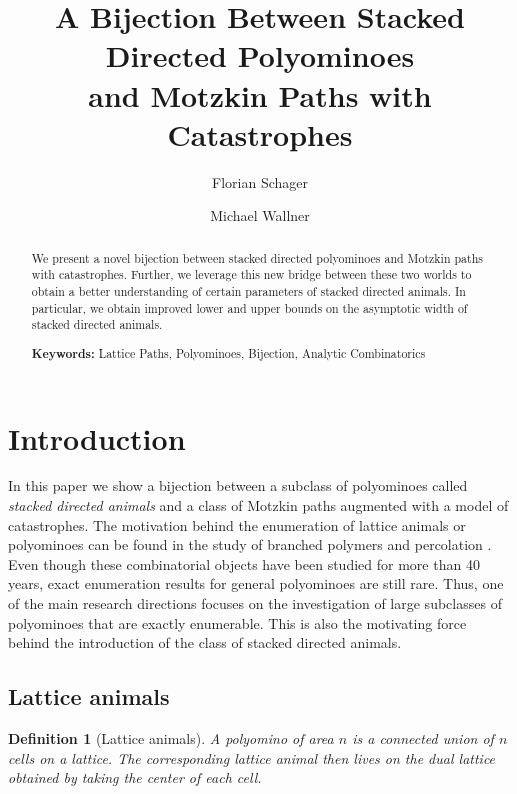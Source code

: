 \documentclass{article}
\title{A Bijection Between Stacked Directed Polyominoes \\ and Motzkin Paths with Catastrophes}
\author{
Florian Schager\addorcid{0009-0009-3923-051X}
\and 
Michael Wallner\addorcid{0000-0001-8581-449X} }
\newtheorem{definition}[theorem]{Definition}
\theoremstyle{definition}
\begin{document}
\maketitle

\begin{abstract}
We present a novel bijection between stacked directed polyominoes and Motzkin paths with catastrophes. Further, we leverage this new bridge between these two worlds to obtain a better understanding of certain parameters of stacked directed animals. In particular, we obtain improved lower and upper bounds on the asymptotic width of stacked directed animals.

\medskip

\noindent\textbf{Keywords: } Lattice Paths, Polyominoes, Bijection, Analytic Combinatorics
\end{abstract}

\tableofcontents

\pagebreak

\section{Introduction}

In this paper we show a bijection between a subclass of polyominoes called \textit{stacked directed animals} and a class of Motzkin paths augmented with a model of catastrophes. The motivation behind the enumeration of lattice animals or polyominoes can be found in the study of branched polymers \cite{Polymers} and percolation \cite{Percolation}. 
Even though these combinatorial objects have been studied for more than 40 years, exact enumeration results for general polyominoes are still rare. 
Thus, one of the main research directions focuses on the investigation of large subclasses of polyominoes that are exactly enumerable. 
This is also the motivating force behind the introduction of the class of stacked directed animals.

\subsection{Lattice animals}

\begin{definition}[Lattice animals]\label{def:lattice_animals}
  A \emph{polyomino} of area $n$ is a connected union of $n$ cells on a lattice. 
  The corresponding \emph{lattice animal} then lives on the dual lattice obtained by taking the center of each cell.
\end{definition}
\end{document}
